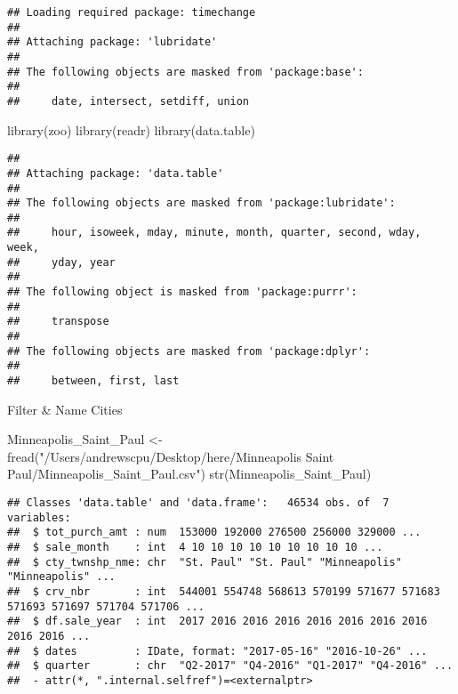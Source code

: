 \documentclass[
]{article}
\newenvironment{Shaded}{\begin{snugshade}}{\end{snugshade}}
\newcommand{\FunctionTok}[1]{\textcolor[rgb]{0.00,0.00,0.00}{#1}}
\newcommand{\NormalTok}[1]{#1}
\newcommand{\OtherTok}[1]{\textcolor[rgb]{0.56,0.35,0.01}{#1}}
\newcommand{\StringTok}[1]{\textcolor[rgb]{0.31,0.60,0.02}{#1}}
\begin{document}
\begin{verbatim}
## Loading required package: timechange
## 
## Attaching package: 'lubridate'
## 
## The following objects are masked from 'package:base':
## 
##     date, intersect, setdiff, union
\end{verbatim}

\begin{Shaded}
\begin{Highlighting}[]
\FunctionTok{library}\NormalTok{(zoo)}
\FunctionTok{library}\NormalTok{(readr)}
\FunctionTok{library}\NormalTok{(data.table)}
\end{Highlighting}
\end{Shaded}

\begin{verbatim}
## 
## Attaching package: 'data.table'
## 
## The following objects are masked from 'package:lubridate':
## 
##     hour, isoweek, mday, minute, month, quarter, second, wday, week,
##     yday, year
## 
## The following object is masked from 'package:purrr':
## 
##     transpose
## 
## The following objects are masked from 'package:dplyr':
## 
##     between, first, last
\end{verbatim}

Filter \& Name Cities

\begin{Shaded}
\begin{Highlighting}[]
\NormalTok{Minneapolis\_Saint\_Paul }\OtherTok{\textless{}{-}} \FunctionTok{fread}\NormalTok{(}\StringTok{"/Users/andrewscpu/Desktop/here/Minneapolis Saint Paul/Minneapolis\_Saint\_Paul.csv"}\NormalTok{)}
\FunctionTok{str}\NormalTok{(Minneapolis\_Saint\_Paul)}
\end{Highlighting}
\end{Shaded}

\begin{verbatim}
## Classes 'data.table' and 'data.frame':   46534 obs. of  7 variables:
##  $ tot_purch_amt : num  153000 192000 276500 256000 329000 ...
##  $ sale_month    : int  4 10 10 10 10 10 10 10 10 10 ...
##  $ cty_twnshp_nme: chr  "St. Paul" "St. Paul" "Minneapolis" "Minneapolis" ...
##  $ crv_nbr       : int  544001 554748 568613 570199 571677 571683 571693 571697 571704 571706 ...
##  $ df.sale_year  : int  2017 2016 2016 2016 2016 2016 2016 2016 2016 2016 ...
##  $ dates         : IDate, format: "2017-05-16" "2016-10-26" ...
##  $ quarter       : chr  "Q2-2017" "Q4-2016" "Q1-2017" "Q4-2016" ...
##  - attr(*, ".internal.selfref")=<externalptr>
\end{verbatim}
\end{document}
